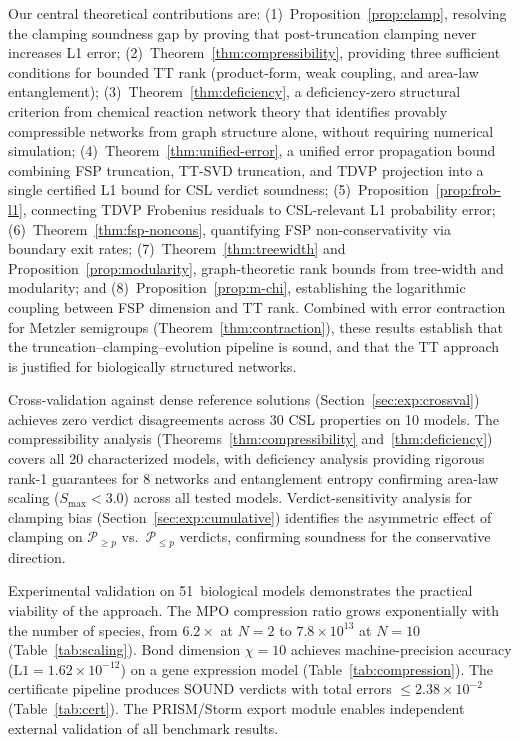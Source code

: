 \documentclass[11pt]{article}
\begin{document}
Our central theoretical contributions are:
(1)~Proposition~\ref{prop:clamp}, resolving the clamping soundness
gap by proving that post-truncation clamping never increases L1 error;
(2)~Theorem~\ref{thm:compressibility}, providing three sufficient
conditions for bounded TT rank (product-form, weak coupling, and
area-law entanglement);
(3)~Theorem~\ref{thm:deficiency}, a deficiency-zero structural criterion
from chemical reaction network theory that identifies provably
compressible networks from graph structure alone, without requiring
numerical simulation;
(4)~Theorem~\ref{thm:unified-error}, a unified error propagation bound
combining FSP truncation, TT-SVD truncation, and TDVP projection into
a single certified L1 bound for CSL verdict soundness;
(5)~Proposition~\ref{prop:frob-l1}, connecting TDVP Frobenius residuals
to CSL-relevant L1 probability error;
(6)~Theorem~\ref{thm:fsp-noncons}, quantifying FSP non-conservativity
via boundary exit rates;
(7)~Theorem~\ref{thm:treewidth} and Proposition~\ref{prop:modularity},
graph-theoretic rank bounds from tree-width and modularity;
and (8)~Proposition~\ref{prop:m-chi}, establishing the logarithmic
coupling between FSP dimension and TT rank.
Combined with error contraction for Metzler semigroups
(Theorem~\ref{thm:contraction}), these results establish that the
truncation--clamping--evolution pipeline is sound, and that the TT
approach is justified for biologically structured networks.

Cross-validation against dense reference solutions
(Section~\ref{sec:exp:crossval}) achieves zero verdict disagreements
across 30 CSL properties on 10 models.
The compressibility analysis (Theorems~\ref{thm:compressibility}
and~\ref{thm:deficiency}) covers all 20 characterized models,
with deficiency analysis providing rigorous rank-1 guarantees for
8 networks and entanglement entropy confirming area-law scaling
($S_{\max} < 3.0$) across all tested models.
Verdict-sensitivity analysis for clamping bias
(Section~\ref{sec:exp:cumulative}) identifies the asymmetric effect
of clamping on $\mathcal{P}_{\geq p}$ vs.\ $\mathcal{P}_{\leq p}$
verdicts, confirming soundness for the conservative direction.

Experimental validation on 51~biological models demonstrates the
practical viability of the approach.
The MPO compression ratio grows exponentially with the number of
species, from $6.2\times$ at $N=2$ to $7.8\times 10^{13}$ at $N=10$
(Table~\ref{tab:scaling}).
Bond dimension $\chi=10$ achieves machine-precision accuracy
($\text{L1} = 1.62\times 10^{-12}$) on a gene expression model
(Table~\ref{tab:compression}).
The certificate pipeline produces SOUND verdicts with total errors
$\leq 2.38\times 10^{-2}$ (Table~\ref{tab:cert}).
The PRISM/Storm export module enables independent external validation
of all benchmark results.
\end{document}
